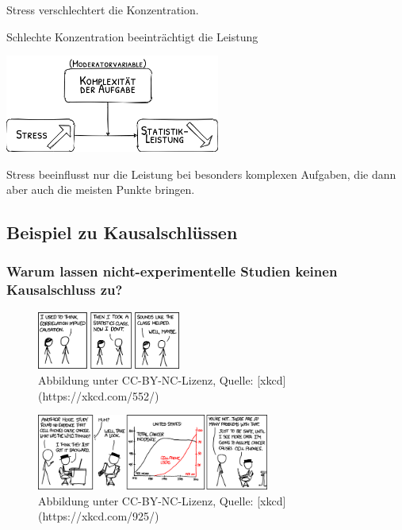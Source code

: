\documentclass[
]{book}
\begin{document}
Stress verschlechtert die Konzentration.

Schlechte Konzentration beeinträchtigt die Leistung

\begin{center}\includegraphics[width=200pt]{imgs/moderator_causality} \end{center}

Stress beeinflusst nur die Leistung bei besonders komplexen Aufgaben, die dann aber auch die meisten Punkte bringen.

\hypertarget{beispiel-zu-kausalschluxfcssen-1}{%
\subsection{Beispiel zu Kausalschlüssen}\label{beispiel-zu-kausalschluxfcssen-1}}

\hypertarget{warum-lassen-nicht-experimentelle-studien-keinen-kausalschluss-zu-2}{%
\subsubsection{Warum lassen nicht-experimentelle Studien keinen Kausalschluss zu?}\label{warum-lassen-nicht-experimentelle-studien-keinen-kausalschluss-zu-2}}

\begin{figure}

{\centering \includegraphics[width=133.333333333333pt]{imgs/correlation} 

}

\caption{Abbildung unter CC-BY-NC-Lizenz, Quelle: [xkcd](https://xkcd.com/552/)}\label{fig:unnamed-chunk-55}
\end{figure}

\begin{figure}

{\centering \includegraphics[width=216.666666666667pt]{imgs/cell_phones} 

}

\caption{Abbildung unter CC-BY-NC-Lizenz, Quelle: [xkcd](https://xkcd.com/925/)}\label{fig:unnamed-chunk-57}
\end{figure}
\end{document}
